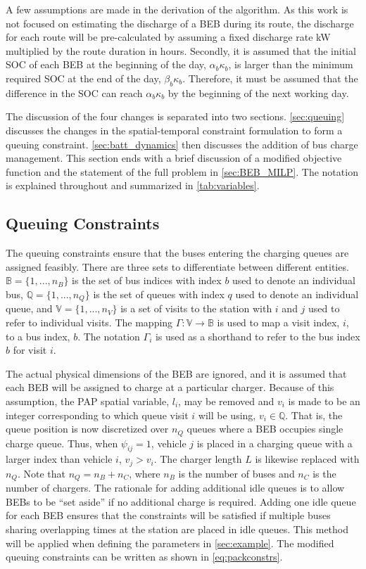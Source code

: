 \documentclass[utf8]{FrontiersinHarvard}
\begin{document}
A few assumptions are made in the derivation of the algorithm. As this work is not focused on estimating the discharge
of a BEB during its route, the discharge for each route will be pre-calculated by assuming a fixed discharge rate kW
multiplied by the route duration in hours. Secondly, it is assumed that the initial SOC of each BEB at the beginning of
the day, \(\alpha_b\kappa_b\), is larger than the minimum required SOC at the end of the day, \(\beta_b\kappa_b\).
Therefore, it must be assumed that the difference in the SOC can reach \(\alpha_b\kappa_b\) by the beginning of the next
working day.

The discussion of the four changes is separated into two sections. \autoref{sec:queuing} discusses the changes in the
spatial-temporal constraint formulation to form a queuing constraint. \autoref{sec:batt_dynamics} then discusses the
addition of bus charge management. This section ends with a brief discussion of a modified objective function and the
statement of the full problem in \autoref{sec:BEB_MILP}. The notation is explained throughout and summarized in
\autoref{tab:variables}.

\subsection{Queuing Constraints}
\label{sec:queuing}
The queuing constraints ensure that the buses entering the charging queues are assigned feasibly. There are three sets
to differentiate between different entities. \(\mathbb{B} = \{1, ..., n_B\}\) is the set of bus indices with index \(b\)
used to denote an individual bus, \(\mathbb{Q} = \{1, ..., n_Q\}\) is the set of queues with index \(q\) used to denote an individual
queue, and \(\mathbb{V} = \{1, ..., n_V\}\) is a set of visits to the station with \(i\) and \(j\) used to refer to individual
visits. The mapping \(\Gamma: \mathbb{V} \rightarrow \mathbb{B}\) is used to map a visit index, \(i\), to a bus index, \(b\). The notation
\(\Gamma_i\) is used as a shorthand to refer to the bus index \(b\) for visit \(i\).

The actual physical dimensions of the BEB are ignored, and it is assumed that each BEB will be assigned to charge at a
particular charger. Because of this assumption, the PAP spatial variable, \(l_i\), may be removed and \(v_i\) is made to be
an integer corresponding to which queue visit \(i\) will be using, \(v_i \in \mathbb{Q}\). That is, the queue position is now
discretized over \(n_Q\) queues where a BEB occupies single charge queue. Thus, when \(\psi_{ij} = 1\), vehicle \(j\) is placed
in a charging queue with a larger index than vehicle \(i\), \(v_j > v_i\). The charger length \(L\) is likewise replaced with
\(n_Q\). Note that \(n_Q = n_B + n_C\), where \(n_B\) is the number of buses and \(n_C\) is the number of chargers. The
rationale for adding additional idle queues is to allow BEBs to be ``set aside'' if no additional charge is required.
Adding one idle queue for each BEB ensures that the constraints will be satisfied if multiple buses sharing overlapping
times at the station are placed in idle queues. This method will be applied when defining the parameters in
\autoref{sec:example}. The modified queuing constraints can be written as shown in \autoref{eq:packconstrs}.
\end{document}
